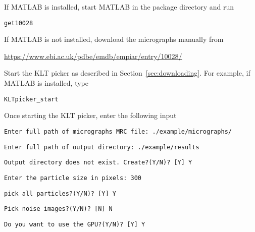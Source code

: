 \documentclass[12pt,a4paper]{article}
\begin{document}
\bigskip

If MATLAB is installed, start MATLAB in the package directory and run
\begin{flushleft}
	\texttt{get10028 \thinspace \color{gray}{\# downloading 5 micrographs to  ./example/micrographs directory.}}
\end{flushleft}

If MATLAB is not installed, download the micrographs manually from
\begin{center}
\url{https://www.ebi.ac.uk/pdbe/emdb/empiar/entry/10028/}
\end{center}

Start the KLT picker as described in Section~\ref{sec:downloading}. For example, if MATLAB is installed, type
\begin{flushleft}
	\texttt{KLTpicker\_start}
\end{flushleft}

\bigskip

Once starting the KLT picker, enter the following input
\begin{flushleft}
	\texttt{Enter full path of micrographs MRC file: ./example/micrographs/}
\end{flushleft}
\begin{flushleft}
	\texttt{Enter full path of output directory: ./example/results}
\end{flushleft}
\begin{flushleft}
	\texttt{Output directory does not exist. Create?(Y/N)? [Y] Y}
\end{flushleft}
\begin{flushleft}
	\texttt{Enter the particle size in pixels: 300}
\end{flushleft}
\begin{flushleft}
	\texttt{pick all particles?(Y/N)? [Y]  Y}
\end{flushleft}
\begin{flushleft}
	\texttt{Pick noise images?(Y/N)? [N] N}
\end{flushleft}
\begin{flushleft}
	\texttt{Do you want to use the GPU?(Y/N)? [Y] Y}
\end{flushleft}
\end{document}

